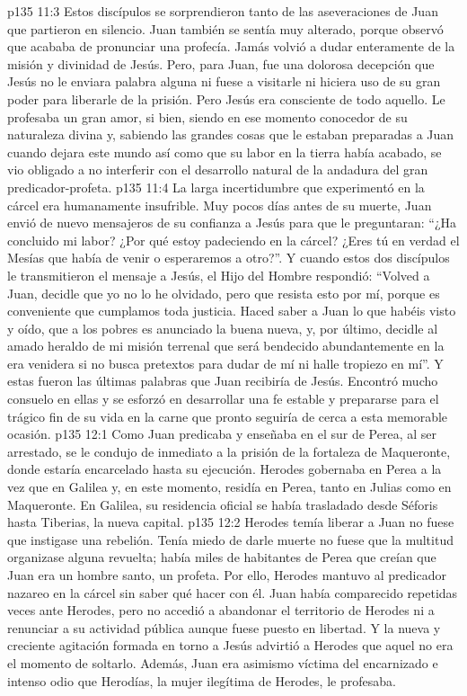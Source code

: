 \vs p135 11:3 \pc Estos discípulos se sorprendieron tanto de las aseveraciones de Juan que partieron en silencio. Juan también se sentía muy alterado, porque observó que acababa de pronunciar una profecía. Jamás volvió a dudar enteramente de la misión y divinidad de Jesús. Pero, para Juan, fue una dolorosa decepción que Jesús no le enviara palabra alguna ni fuese a visitarle ni hiciera uso de su gran poder para liberarle de la prisión. Pero Jesús era consciente de todo aquello. Le profesaba un gran amor, si bien, siendo en ese momento conocedor de su naturaleza divina y, sabiendo las grandes cosas que le estaban preparadas a Juan cuando dejara este mundo así como que su labor en la tierra había acabado, se vio obligado a no interferir con el desarrollo natural de la andadura del gran predicador\hyp{}profeta.
\vs p135 11:4 \pc La larga incertidumbre que experimentó en la cárcel era humanamente insufrible. Muy pocos días antes de su muerte, Juan envió de nuevo mensajeros de su confianza a Jesús para que le preguntaran: “¿Ha concluido mi labor? ¿Por qué estoy padeciendo en la cárcel? ¿Eres tú en verdad el Mesías que había de venir o esperaremos a otro?”. Y cuando estos dos discípulos le transmitieron el mensaje a Jesús, el Hijo del Hombre respondió: “Volved a Juan, decidle que yo no lo he olvidado, pero que resista esto por mí, porque es conveniente que cumplamos toda justicia. Haced saber a Juan lo que habéis visto y oído, que a los pobres es anunciado la buena nueva, y, por último, decidle al amado heraldo de mi misión terrenal que será bendecido abundantemente en la era venidera si no busca pretextos para dudar de mí ni halle tropiezo en mí”. Y estas fueron las últimas palabras que Juan recibiría de Jesús. Encontró mucho consuelo en ellas y se esforzó en desarrollar una fe estable y prepararse para el trágico fin de su vida en la carne que pronto seguiría de cerca a esta memorable ocasión.
\vs p135 12:1 Como Juan predicaba y enseñaba en el sur de Perea, al ser arrestado, se le condujo de inmediato a la prisión de la fortaleza de Maqueronte, donde estaría encarcelado hasta su ejecución. Herodes gobernaba en Perea a la vez que en Galilea y, en este momento, residía en Perea, tanto en Julias como en Maqueronte. En Galilea, su residencia oficial se había trasladado desde Séforis hasta Tiberias, la nueva capital.
\vs p135 12:2 Herodes temía liberar a Juan no fuese que instigase una rebelión. Tenía miedo de darle muerte no fuese que la multitud organizase alguna revuelta; había miles de habitantes de Perea que creían que Juan era un hombre santo, un profeta. Por ello, Herodes mantuvo al predicador nazareo en la cárcel sin saber qué hacer con él. Juan había comparecido repetidas veces ante Herodes, pero no accedió a abandonar el territorio de Herodes ni a renunciar a su actividad pública aunque fuese puesto en libertad. Y la nueva y creciente agitación formada en torno a Jesús advirtió a Herodes que aquel no era el momento de soltarlo. Además, Juan era asimismo víctima del encarnizado e intenso odio que Herodías, la mujer ilegítima de Herodes, le profesaba.
